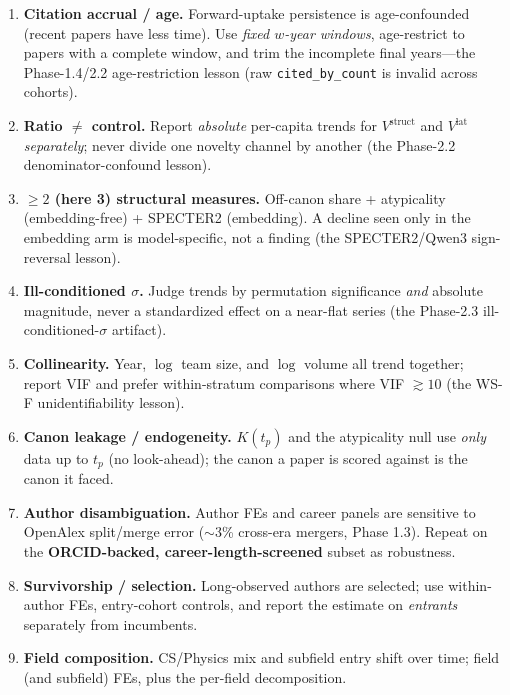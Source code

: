 \documentclass[11pt,letterpaper]{article}
\theoremstyle{definition}
\theoremstyle{plain}
\newcommand{\Vstruct}{V^{\mathrm{struct}}}
\newcommand{\Vlat}{V^{\mathrm{lat}}}
\begin{document}
\begin{enumerate}[label=\textbf{C\arabic*.}]
  \item \textbf{Citation accrual / age.} Forward-uptake persistence is
  age-confounded (recent papers have less time). Use \emph{fixed $w$-year
  windows}, age-restrict to papers with a complete window, and trim the incomplete
  final years---the Phase-1.4/2.2 age-restriction lesson (raw \texttt{cited\_by\_count}
  is invalid across cohorts).
  \item \textbf{Ratio $\ne$ control.} Report \emph{absolute} per-capita trends for
  $\Vstruct$ and $\Vlat$ \emph{separately}; never divide one novelty channel by
  another (the Phase-2.2 denominator-confound lesson).
  \item \textbf{$\ge 2$ (here 3) structural measures.} Off-canon share +
  atypicality (embedding-free) + SPECTER2 (embedding). A decline seen only in the
  embedding arm is model-specific, not a finding (the SPECTER2/Qwen3 sign-reversal
  lesson).
  \item \textbf{Ill-conditioned $\sigma$.} Judge trends by permutation
  significance \emph{and} absolute magnitude, never a standardized effect on a
  near-flat series (the Phase-2.3 ill-conditioned-$\sigma$ artifact).
  \item \textbf{Collinearity.} Year, $\log$ team size, and $\log$ volume all trend
  together; report VIF and prefer within-stratum comparisons where VIF $\gtrsim 10$
  (the WS-F unidentifiability lesson).
  \item \textbf{Canon leakage / endogeneity.} $K(t_p)$ and the atypicality null use
  \emph{only} data up to $t_p$ (no look-ahead); the canon a paper is scored against
  is the canon it faced.
  \item \textbf{Author disambiguation.} Author FEs and career panels are sensitive
  to OpenAlex split/merge error ($\sim$3\% cross-era mergers, Phase 1.3). Repeat on
  the \textbf{ORCID-backed, career-length-screened} subset as robustness.
  \item \textbf{Survivorship / selection.} Long-observed authors are selected; use
  within-author FEs, entry-cohort controls, and report the estimate on
  \emph{entrants} separately from incumbents.
  \item \textbf{Field composition.} CS/Physics mix and subfield entry shift over
  time; field (and subfield) FEs, plus the per-field decomposition.
\end{enumerate}

\end{document}
